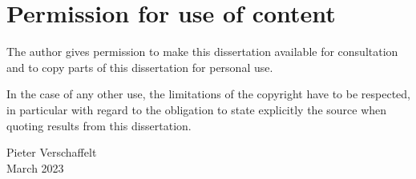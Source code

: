 \makeatletter
\renewcommand*\@makeschapterhead[1]{%
        {%
        \singlespacing\parindent\z@\raggedright\normalfont
        \interlinepenalty\@M
        \sffamily\Huge\bfseries
        #1\par
        \nobreak\vskip 20\p@
        \onehalfspacing
    }
}
\makeatother

\chapter*{Permission for use of content}
The author gives permission to make this dissertation available for consultation and to copy parts of this dissertation for personal use.

In the case of any other use, the limitations of the copyright have to be respected, in particular with regard to the obligation to state explicitly the source when quoting results from this dissertation.

\begin{flushright}
    Pieter Verschaffelt \\
    March 2023
\end{flushright}
